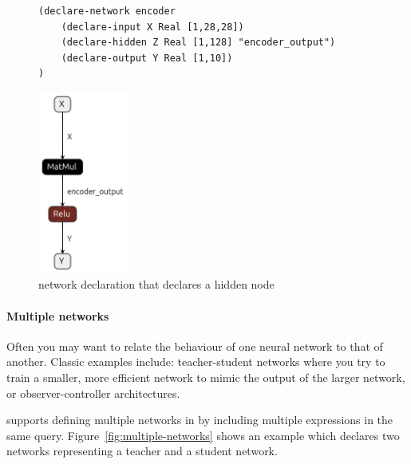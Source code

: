 
\begin{figure}[h!]
    \begin{minipage}[c]{0.65\textwidth}
        \begin{lstlisting}[style=lbnf]   
(declare-network encoder
    (declare-input X Real [1,28,28])
    (declare-hidden Z Real [1,128] "encoder_output")
    (declare-output Y Real [1,10])
)\end{lstlisting}
    \end{minipage}%
    \begin{minipage}[c]{0.35\textwidth}
        \centering
        \includegraphics[height=6cm]{imgs/encoder_net.onnx.png}
    \end{minipage}
    \caption{\vnnlib{} network declaration that declares a hidden node}
    \label{fig:hidden-node}
\end{figure}

\paragraph{Multiple networks}

Often you may want to relate the behaviour of one neural network to that of another. Classic examples include: teacher-student networks where you try to train a smaller, more efficient network to mimic the output of the larger network, or observer-controller architectures.

\vnnlib{} supports defining multiple networks in by including multiple  expressions in the same query. Figure~\ref{fig:multiple-networks} 
shows an example which declares two networks representing a teacher and a student network.

